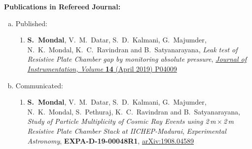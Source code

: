 \documentclass[a4paper,12pt,twoside,openany]{article}
\begin{document}
\clearpage{\thispagestyle{empty}\cleardoublepage}

\noindent\textbf{Publications in Refereed Journal:}
\begin{enumerate}[a.]
\item Published:
  \begin{enumerate}[1)]
  \item \textbf{S.~Mondal}, V.~M.~Datar, S.~D.~Kalmani, G.~Majumder, N.~K.~Mondal, K.~C.~Ravindran and B.~Satyanarayana, \emph{Leak test of Resistive Plate Chamber gap by monitoring absolute pressure}, \href{https://doi.org/10.1088/1748-0221/14/04/P04009}{\emph{Journal of Instrumentation, Volume } \textbf{14} (April 2019) P04009}
  \end{enumerate}
\item Communicated:
  \begin{enumerate}[1)]
  \item \textbf{S.~Mondal}, V.~M.~Datar, S.~D.~Kalmani, G.~Majumder, N.~K.~Mondal, S.~Pethuraj, K.~C.~Ravindran and B.~Satyanarayana, \emph{Study of Particle Multiplicity of Cosmic Ray Events using 2\,m\,$\times$\,2\,m Resistive Plate Chamber Stack at IICHEP-Madurai}, \emph{Experimental Astronomy}, \textbf{EXPA-D-19-00048R1}, \href{https://arxiv.org/abs/1908.04589}{arXiv:1908.04589}
  \end{enumerate}
\end{enumerate}
\end{document}
